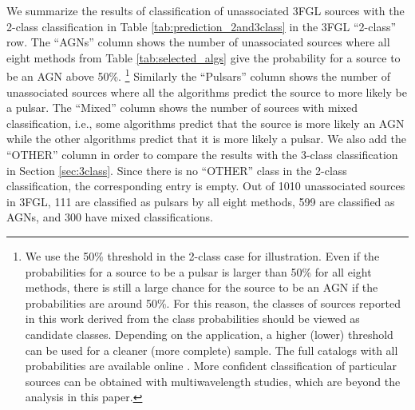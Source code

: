 We summarize the results of classification of unassociated 3FGL sources with the 2-class classification 
in Table \ref{tab:prediction_2and3class} in the 3FGL ``2-class'' row.
The ``AGNs'' column shows the number of unassociated sources where all eight methods from Table \ref{tab:selected_algs} 
give the probability for a source to be an AGN above 50\%.%
\footnote{We use the 50\% threshold in the 2-class case for illustration. Even if the probabilities for a source to be a pulsar is larger than 50\% for all eight methods, there is still a large chance for the source to be an AGN if the probabilities are around 50\%. 
For this reason, the classes of sources reported in this work derived from the class probabilities should be viewed as candidate classes.
Depending on the application, a higher (lower) threshold can be used for a cleaner (more complete) sample. The full catalogs with all probabilities are available online \citep{SOM_material}.
More confident classification of particular sources can be obtained with multiwavelength studies, 
which are beyond the analysis in this paper.}
Similarly the ``Pulsars'' column shows the number of unassociated sources where all the algorithms predict the source to more likely be a pulsar.
The ``Mixed'' column shows the number of sources with mixed classification, i.e., some algorithms predict that the source is more likely an AGN while the other algorithms predict that it is more likely a pulsar.
We also add the ``OTHER'' column in order to compare the results with the 3-class classification in Section \ref{sec:3class}.
Since there is no ``OTHER'' class in the 2-class classification, the corresponding entry is empty.
Out of 1010 unassociated sources in 3FGL, 111 are classified as pulsars by all eight methods, 599 are classified as AGNs, and 300 have mixed classifications.




